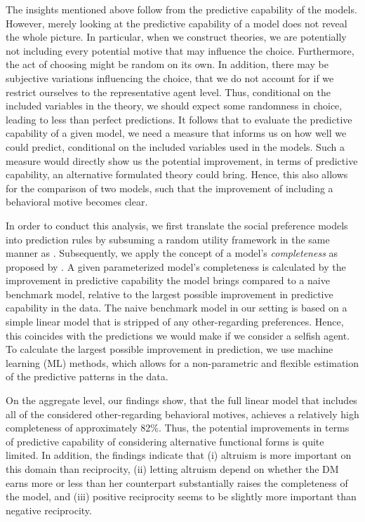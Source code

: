 \documentclass[11pt,a4paper]{article}
\theoremstyle{definition}
\begin{document}
The insights mentioned above follow from the predictive capability of the models. However, merely looking at the predictive capability of a model does not reveal the whole picture. In particular, when we construct theories, we are potentially not including every potential motive that may influence the choice.  Furthermore, the act of choosing might be random on its own. In addition, there may be subjective variations influencing the choice, that we do not account for if we restrict ourselves to the representative agent level. Thus, conditional on the included variables in the theory, we should expect some randomness in choice, leading to less than perfect predictions. It follows that to evaluate the predictive capability of a given model, we need a measure that informs us on how well we could predict, conditional on the included variables used in the models.  Such a measure would directly show us the potential improvement, in terms of predictive capability, an alternative formulated theory could bring. Hence, this also allows for the comparison of two models, such that the improvement of including a behavioral motive becomes clear.

In order to conduct this analysis, we first translate the social preference models into prediction rules by subsuming a random utility framework in the same manner as \cite{Bruhin2019}. Subsequently, we apply the concept of a model's \emph{completeness} as proposed by \cite{Fudenberg2021b}. A given parameterized model's completeness is calculated by the improvement in predictive capability the model brings compared to a naive benchmark model, relative to the largest possible improvement in predictive capability in the data. The naive benchmark model in our setting is based on a simple linear model that is stripped of any other-regarding preferences. Hence, this coincides with the predictions we would make if we consider a selfish agent. To calculate the largest possible improvement in prediction, we use machine learning (ML) methods, which allows for a non-parametric and flexible estimation of the predictive patterns in the data.

On the aggregate level, our findings show, that the full linear model that includes all of the considered other-regarding behavioral motives, achieves a relatively high completeness of approximately 82\%. Thus, the potential improvements in terms of predictive capability of considering alternative functional forms is quite limited. In addition, the findings indicate that (i) altruism is more important on this domain than reciprocity, (ii) letting altruism depend on whether the DM earns more or less than her counterpart substantially raises the completeness of the model, and (iii) positive reciprocity seems to be slightly more important than negative reciprocity.
\end{document}
